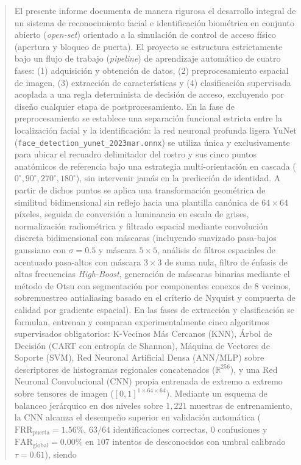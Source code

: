 \documentclass{article}
\begin{document}


\tableofcontents
\newpage

\listoffigures
\listoftables
\newpage


\begin{abstract}
El presente informe documenta de manera rigurosa el desarrollo integral de un sistema de reconocimiento facial e identificación biométrica en conjunto abierto (\textit{open-set}) orientado a la simulación de control de acceso físico (apertura y bloqueo de puerta). El proyecto se estructura estrictamente bajo un flujo de trabajo (\textit{pipeline}) de aprendizaje automático de cuatro fases: (1) adquisición y obtención de datos, (2) preprocesamiento espacial de imagen, (3) extracción de características y (4) clasificación supervisada acoplada a una regla determinista de decisión de acceso, excluyendo por diseño cualquier etapa de postprocesamiento. En la fase de preprocesamiento se establece una separación funcional estricta entre la localización facial y la identificación: la red neuronal profunda ligera YuNet (\texttt{face\_detection\_yunet\_2023mar.onnx}) se utiliza única y exclusivamente para ubicar el recuadro delimitador del rostro y sus cinco puntos anatómicos de referencia bajo una estrategia multi-orientación en cascada ($0^\circ, 90^\circ, 270^\circ, 180^\circ$), sin intervenir jamás en la predicción de identidad. A partir de dichos puntos se aplica una transformación geométrica de similitud bidimensional sin reflejo hacia una plantilla canónica de $64 \times 64$ píxeles, seguida de conversión a luminancia en escala de grises, normalización radiométrica y filtrado espacial mediante convolución discreta bidimensional con máscaras (incluyendo suavizado pasa-bajos gaussiano con $\sigma = 0.5$ y máscara $5 \times 5$, análisis de filtros espaciales de acentuado pasa-altos con máscara $3 \times 3$ de suma nula, filtro de énfasis de altas frecuencias \textit{High-Boost}, generación de máscaras binarias mediante el método de Otsu con segmentación por componentes conexos de 8 vecinos, sobremuestreo antialiasing basado en el criterio de Nyquist y compuerta de calidad por gradiente espacial). En las fases de extracción y clasificación se formulan, entrenan y comparan experimentalmente cinco algoritmos supervisados obligatorios: K-Vecinos Más Cercanos (KNN), Árbol de Decisión (CART con entropía de Shannon), Máquina de Vectores de Soporte (SVM), Red Neuronal Artificial Densa (ANN/MLP) sobre descriptores de histogramas regionales concatenados ($\mathbb{R}^{256}$), y una Red Neuronal Convolucional (CNN) propia entrenada de extremo a extremo sobre tensores de imagen ($[0,1]^{1 \times 64 \times 64}$). Mediante un esquema de balanceo jerárquico en dos niveles sobre $1,221$ muestras de entrenamiento, la CNN alcanza el desempeño superior en validación automática ($\text{FRR}_{\text{puerta}} = 1.56\%$, $63/64$ identificaciones correctas, $0$ confusiones y $\text{FAR}_{\text{global}} = 0.00\%$ en $107$ intentos de desconocidos con umbral calibrado $\tau = 0.61$), siendo 
\end{abstract}
\end{document}
